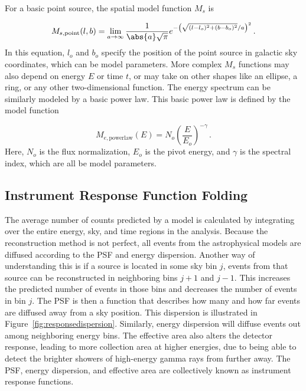   For a basic point source, the spatial model function $M_s$ is

  \begin{equation}\label{eqn:pntsrc_Ms}
    M_{s,\textrm{point}}(l,b) = \lim_{a\to\infty} \frac{1}{ \abs{a} \sqrt{\pi} } e^{ - \left ( \sqrt{ (l-l_o)^2 + (b-b_o)^2 }/a \right )^2 } \,.
  \end{equation}
  In this equation, $l_o$ and $b_o$ specify the position of the point source in galactic sky coordinates, which can be model parameters.
  More complex $M_s$ functions may also depend on energy $E$ or time $t$, or may take on other shapes like an ellipse, a ring, or any other two-dimensional function.
  The energy spectrum can be similarly modeled by a basic power law.
  This basic power law is defined by the model function
  
  \begin{equation}\label{eqn:powerlaw_Me}
    M_{e,\textrm{powerlaw}}(E) = N_o \left ( \frac{E}{E_o} \right )^{-\gamma} \,.
  \end{equation}
  Here, $N_o$ is the flux normalization, $E_o$ is the pivot energy, and $\gamma$ is the spectral index, which are all be model parameters.

  
  \subsection{Instrument Response Function Folding}\label{subsec:folding}
  The average number of counts predicted by a model is calculated by integrating over the entire energy, sky, and time regions in the analysis.
  Because the reconstruction method is not perfect, all events from the astrophysical models are diffused according to the PSF and energy dispersion.
  Another way of understanding this is if a source is located in some sky bin $j$, events from that source can be reconstructed in neighboring bins $j+1$ and $j-1$.
  This increases the predicted number of events in those bins and decreases the number of events in bin $j$.
  The PSF is then a function that describes how many and how far events are diffused away from a sky position.
  This dispersion is illustrated in Figure~\ref{fig:responsedispersion}.
  Similarly, energy dispersion will diffuse events out among neighboring energy bins.
  The effective area also alters the detector response, leading to more collection area at higher energies, due to being able to detect the brighter showers of high-energy gamma rays from further away.
  The PSF, energy dispersion, and effective area are collectively known as instrument response functions.
  
